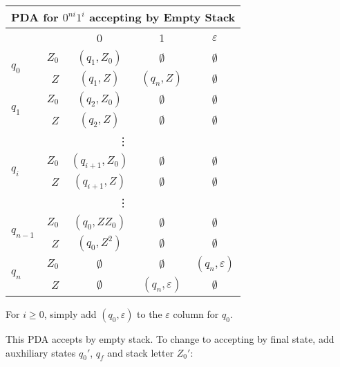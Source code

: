 \begin{center}\begin{tabular}{l r c c c}
    \multicolumn{5}{c}{PDA for \(0^{ni} 1^i\) accepting by Empty Stack}\\\bottomrule
    & & 0 & 1 & \(\varepsilon \) \\\cmidrule{3-5}
    \multirow{2}{*}{\(q_0\)} & \(Z_0\) & \((q_1, Z_0)\) & \(\emptyset \) & \(\emptyset \) \\
    & \(Z\) & \((q_1, Z)\) & \((q_n, Z) \) & \(\emptyset \) \\\midrule
    \multirow{2}{*}{\(q_1\)} & \(Z_0\) & \((q_2, Z_0)\) & \(\emptyset \) & \(\emptyset \) \\
    & \(Z\) & \((q_2, Z) \)  & \(\emptyset \) & \(\emptyset \) \\\midrule
    \multicolumn{5}{c}{\vdots}\\\midrule
    \multirow{2}{*}{\(q_i\)} & \(Z_0\) & \((q_{i+1}, Z_0)\) & \(\emptyset \) &  \(\emptyset \) \\
    & \(Z\) & \((q_{i+1}, Z) \) & \(\emptyset \) & \(\emptyset \) \\\midrule
    \multicolumn{5}{c}{\vdots}\\\midrule
    \multirow{2}{*}{\(q_{n-1}\)} & \(Z_0\) & \((q_0, ZZ_0)\) & \(\emptyset \) & \(\emptyset \) \\
    & \(Z\)  & \((q_0, Z^2) \) & \(\emptyset \) & \(\emptyset \) \\\midrule
    \multirow{2}{*}{\(q_n\)} & \(Z_0\) & \(\emptyset \) & \(\emptyset \) & \((q_n, \varepsilon)\) \\
    & \(Z\) & \(\emptyset \)  & \((q_n, \varepsilon ) \) &  \(\emptyset \) \\\midrule
\end{tabular}\end{center}

For \(i\geq0\), simply add \((q_0, \varepsilon)\) to the \(\varepsilon \) column for \(q_0\). 

This PDA accepts by empty stack. To change to accepting by final state, add auxhiliary states \(q_0'\), \(q_f\) and stack letter \(Z_0'\):

